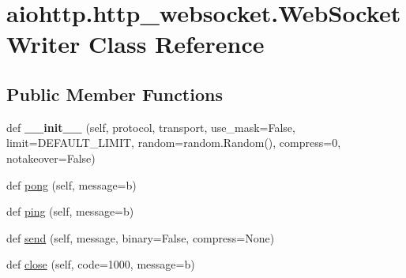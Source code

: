 \hypertarget{classaiohttp_1_1http__websocket_1_1_web_socket_writer}{}\section{aiohttp.\+http\+\_\+websocket.\+Web\+Socket\+Writer Class Reference}
\label{classaiohttp_1_1http__websocket_1_1_web_socket_writer}
\subsection*{Public Member Functions}
\begin{DoxyCompactItemize}
\item 
\mbox{\label{classaiohttp_1_1http__websocket_1_1_web_socket_writer_a33397e82b59a4b8d21fb3ff4ec86ad0d}} 
def {\bfseries \+\_\+\+\_\+init\+\_\+\+\_\+} (self, protocol, transport, use\+\_\+mask=False, limit=D\+E\+F\+A\+U\+L\+T\+\_\+\+L\+I\+M\+IT, random=random.\+Random(), compress=0, notakeover=False)
\item 
def \hyperlink{classaiohttp_1_1http__websocket_1_1_web_socket_writer_adc15b9ddd24ca2eaf24ee1873233ac8c}{pong} (self, message=b\textquotesingle{}\textquotesingle{})
\item 
def \hyperlink{classaiohttp_1_1http__websocket_1_1_web_socket_writer_ae280b448c45b713bf19d917f31b5796e}{ping} (self, message=b\textquotesingle{}\textquotesingle{})
\item 
def \hyperlink{classaiohttp_1_1http__websocket_1_1_web_socket_writer_ab2bc04b540c8f5ebce8fba83670481b4}{send} (self, message, binary=False, compress=None)
\item 
def \hyperlink{classaiohttp_1_1http__websocket_1_1_web_socket_writer_a53ef0e88de3aaf1593a7c9252e8f6a5c}{close} (self, code=1000, message=b\textquotesingle{}\textquotesingle{})
\end{DoxyCompactItemize}
